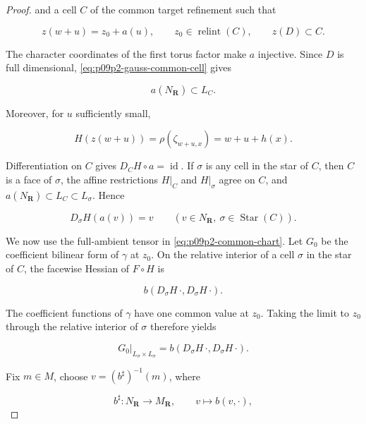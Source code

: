 \begin{proof}
and a cell \(C\) of the common target refinement such that

\begin{equation}
\label{eq:p09p2-gauss-common-cell}
 z(w+u)=z_0+a(u),
 \qquad
 z_0\in\operatorname{relint}(C),
 \qquad
 z(D)\subset C.
\end{equation}

The character coordinates of the first torus factor make \(a\) injective.
Since \(D\) is full dimensional, \eqref{eq:p09p2-gauss-common-cell} gives

\begin{equation}
\label{eq:p09p2-gauss-lineality}
                         a(N_{\mathbf R})\subset L_C.
\end{equation}

Moreover, for \(u\) sufficiently small,

\[
 H(z(w+u))=\rho(\zeta_{w+u,x})=w+u+h(x).
\]

Differentiation on \(C\) gives \(D_CH\circ a=\operatorname{id}\).  If
\(\sigma\) is any cell in the star of \(C\), then \(C\) is a face of
\(\sigma\), the affine restrictions \(H|_C\) and \(H|_\sigma\) agree on
\(C\), and \(a(N_{\mathbf R})\subset L_C\subset L_\sigma\).  Hence

\begin{equation}
\label{eq:p09p2-H-lineality}
              D_\sigma H(a(v))=v
 \qquad
 (v\in N_{\mathbf R},\ \sigma\in\operatorname{Star}(C)).
\end{equation}

We now use the full-ambient tensor in
\eqref{eq:p09p2-common-chart}.  Let \(G_0\) be the coefficient bilinear
form of \(\gamma\) at \(z_0\).  On the relative interior of a cell
\(\sigma\) in the star of \(C\), the facewise Hessian of \(F\circ H\) is

\[
              b(D_\sigma H\,\mathord\cdot,
                D_\sigma H\,\mathord\cdot).
\]

The coefficient functions of \(\gamma\) have one common value at
\(z_0\).  Taking the limit to \(z_0\) through the relative interior of
\(\sigma\) therefore yields

\begin{equation}
\label{eq:p09p2-wall-tensor}
 \left.G_0\right|_{L_\sigma\times L_\sigma}
 =b(D_\sigma H\,\mathord\cdot,D_\sigma H\,\mathord\cdot).
\end{equation}

Fix \(m\in M\), choose \(v=(b^\sharp)^{-1}(m)\), where

\[
 b^\sharp:N_{\mathbf R}\longrightarrow M_{\mathbf R},
 \qquad v\longmapsto b(v,\mathord\cdot),
\]


\end{proof}
